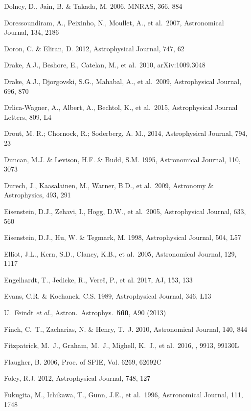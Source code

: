 \documentclass[twocolumn]{aastex61}
\begin{document}
\begin{thebibliography}{}
\bibitem[()]{} Dolney, D., Jain, B. \& Takada, M. 2006, MNRAS, 366, 884

\bibitem[()]{} Doressoundiram, A., Peixinho, N., Moullet, A., et al.~2007, Astronomical Journal, 134, 2186

\bibitem[()]{} Doron, C. \& Eliran, D. 2012, Astrophysical Journal, 747, 62

\bibitem[()]{} Drake, A.J., Beshore, E., Catelan, M., et al.~2010, arXiv:1009.3048

\bibitem[()]{} Drake, A.J., Djorgovski, S.G., Mahabal, A., et al.~2009, Astrophysical Journal, 696, 870

\bibitem[()]{} Drlica-Wagner, A., Albert, A., Bechtol, K., et al.\ 2015, Astrophysical Journal Letters, 809, L4

\bibitem[()]{} Drout, M. R.; Chornock, R.; Soderberg, A. M., 2014, Astrophysical Journal,  794, 23

\bibitem[()]{} Duncan, M.J. \& Levison, H.F. \& Budd, S.M. 1995, Astronomical Journal, 110, 3073

\bibitem[()]{} Durech, J., Kaasalainen, M., Warner, B.D., et al.~2009, Astronomy \& Astrophysics, 493, 291

\bibitem[()]{} Eisenstein, D.J., Zehavi, I., Hogg, D.W., et al.~2005, Astrophysical Journal, 633, 560

\bibitem[()]{} Eisenstein, D.J., Hu, W. \& Tegmark, M. 1998, Astrophysical Journal, 504, L57

\bibitem[()]{} Elliot, J.L., Kern, S.D., Clancy, K.B., et al.~2005,  Astronomical Journal, 129, 1117

\bibitem[()]{} Engelhardt, T., Jedicke, R., Vere\v{s}, P., et al. 2017, AJ, 153, 133

\bibitem[()]{} Evans, C.R. \& Kochanek, C.S. 1989, Astrophysical Journal, 346, L13

\bibitem[()]{}  U.~Feindt {\it et al.}, Astron.\ Astrophys.\  {\bf 560}, A90 (2013)

\bibitem[()]{} Finch, C.~T., Zacharias, N. \& Henry, T.~J. 2010, Astronomical Journal, 140, 844

 Fitzpatrick, M.~J., Graham, M.~J., Mighell, K.~J., et al.\ 2016, \procspie, 9913, 99130L

\bibitem[()]{} Flaugher, B. 2006, Proc. of SPIE, Vol. 6269, 62692C

\bibitem[()]{} Foley, R.J. 2012, Astrophysical Journal, 748, 127

\bibitem[()]{} Fukugita, M., Ichikawa, T., Gunn, J.E., et al.~1996, Astronomical Journal, 111, 1748


\end{thebibliography}
\end{document}
